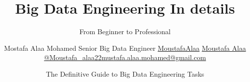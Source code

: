 \title[Big Data Engineering In details] %
{Big Data Engineering In details}

\subtitle{From Beginner to Professional}

\author[Mostafa Alaa] %
{Mostafa Alaa Mohamed \newline Senior Big Data Engineer \newline 
	\faGithub \space \href{https://github.com/moustafaalaa/}{MoustafaAlaa}	
	\faLinkedin \space \href{https://www.linkedin.com/in/moustafa-alaa/}{Moustafa Alaa}
	\faTwitter \space \href{https://twitter.com/moustafa_alaa22}{@Moustafa\_alaa22}\newline	\faEnvelope \space \href{mailto: mustafa.alaa.mohamed@gmail.com}{mustafa.alaa.mohamed@gmail.com} 
}



\date[\today] %
{The Definitive Guide to Big Data Engineering Tasks}




